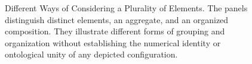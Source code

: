 \begin{figure}[htbp]

    \caption{Different Ways of Considering a Plurality of Elements.
    The panels distinguish distinct elements, an aggregate,
    and an organized composition. They illustrate different
    forms of grouping and organization without establishing
    the numerical identity or ontological unity of any
    depicted configuration.}
    \label{fig:multiplicity-grouping-and-organization}
\end{figure}

